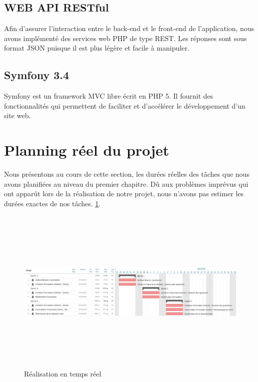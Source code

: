 \subsection{WEB API RESTful}
Afin d’assurer l’interaction entre le back-end et le front-end de l'application, nous avons implémenté des services web PHP de type REST.
Les réponses sont sous format JSON puisque il est plus légère et facile à manipuler.
\subsection{Symfony 3.4}
Symfony est un framework MVC libre écrit en PHP 5. Il fournit des fonctionnalités qui permettent de faciliter et d’accélérer le développement d'un site web. 
\section{Planning réel du projet}
Nous présentons au cours de cette section, les durées réelles des tâches que nous avons
planifiées au niveau du premier chapitre.
Dû aux problèmes imprévus qui ont apparût lors de la réalisation de notre projet, nous
n’avons pas estimer les durées exactes de nos tâches.  \ref{fig6}.
\begin{figure} [H]
    \centering
         \begin{center}
             \includegraphics [width=16cm,height=8cm] {img/GANTTdiag.jpg}
            \caption{Réalisation en temps réel }
            \label{fig6}
        \end{center}
    \end{figure}
    
